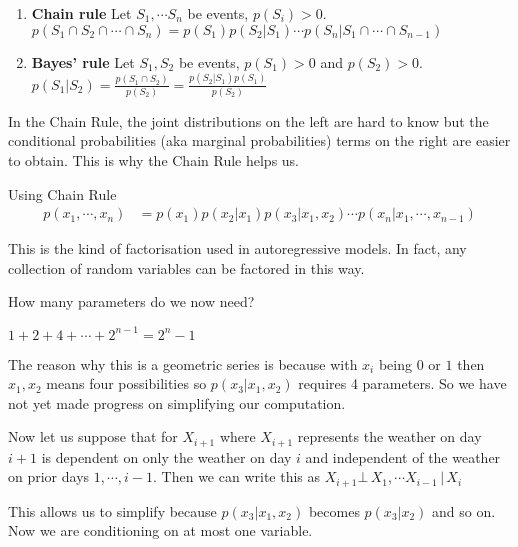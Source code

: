 \documentclass{article}
\begin{document}
\begin{enumerate}
    \item \textbf{Chain rule} Let $ S_{1}, \cdots S_{n} $ be events, $ p(S_{i}) > 0 $.
    \newline
    $ p(S_{1} \cap S_{2} \cap \cdots \cap S_{n}) = p(S_{1})p(S_{2} | S_{1}) \cdots p(S_{n} | S_{1} \cap \cdots \cap S_{n-1})  $
    \item \textbf{Bayes' rule} Let $ S_{1}, S_{2} $ be events, $ p(S_{1}) > 0 $ and $ p(S_{2}) > 0 $.
    \newline
    $ p (S_{1} | S_{2}) = \frac{p(S_{1} \cap S_{2})}{p(S_{2})} = \frac{p(S_{2} | S_{1})p(S_{1})}{p(S_{2})}$
\end{enumerate}

In the Chain Rule, the joint distributions on the left are hard to know but the conditional probabilities (aka marginal probabilities) terms on the right are easier to obtain.  This is why the Chain Rule helps us.

Using Chain Rule
\begin{align}
    p(x_{1}, \cdots , x_{n}) &= p(x_{1})p(x_{2} | x_{1})p(x_{3} | x_{1},x_{2}) \cdots p(x_{n} | x_{1}, \cdots , x_{n-1})
\end{align}

This is the kind of factorisation used in autoregressive models.
In fact, any collection of random variables can be factored in this way.

How many parameters do we now need?

$ 1 + 2 + 4 + \cdots + 2^{n-1} = 2^{n} - 1$

The reason why this is a geometric series is because with $ x_{i} $ being $0$ or $1$ then $ x_{1},x_{2} $ means four possibilities so $ p(x_{3} | x_{1}, x_{2}) $ requires 4 parameters. So we have not yet made progress on simplifying our computation.

Now let us suppose that for $ X_{i+1} $ where $X_{i+1}$ represents the weather on day $ i + 1 $ is dependent on only the weather on day $ i $ and independent of the weather on prior days $ 1, \cdots , i - 1 $.  Then we can write this as
$ X_{i+1} \bot \, X_{1}, \cdots X_{i-1} \, | \, X_{i} $

This allows us to simplify because
$ p(x_{3} | x_{1}, x_{2}) $ becomes $ p(x_{3} | x_{2}) $ and so on.
Now we are conditioning on at most one variable.

\end{document}
